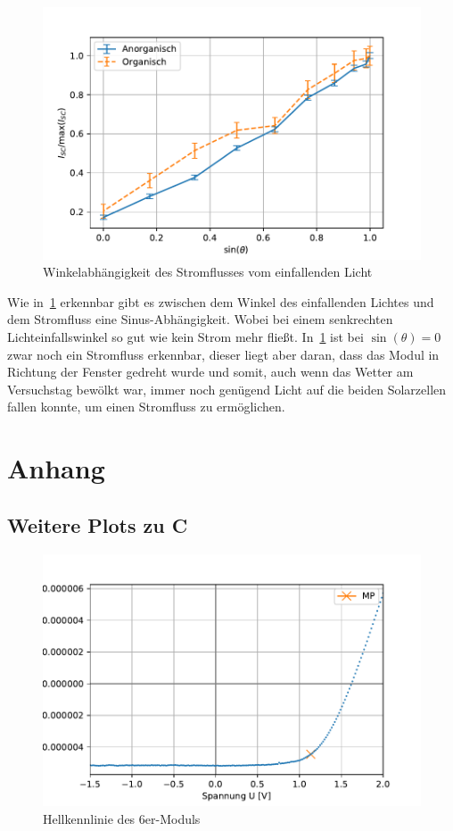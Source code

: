 \documentclass[slug=SZ, room=Hermann-Krone-Bau\,\ Labor\ 1.25, supervisor=Martin\ Kroll]{../../Lab_Report_LaTeX/lab_report}
\begin{document}
\begin{figure}[H]\centering
        \includegraphics[width=.5\columnwidth]{figs/python/E/relativ.pdf}
        \caption{Winkelabhängigkeit des Stromflusses vom einfallenden Licht}
        \label{fig:winkel}
\end{figure}

Wie in~\ref{fig:winkel} erkennbar gibt es zwischen dem Winkel des einfallenden
Lichtes und dem Stromfluss eine Sinus-Abhängigkeit. Wobei bei einem senkrechten
Lichteinfallswinkel so gut wie kein Strom mehr fließt.
In~\ref{fig:winkel} ist bei \(\sin(\theta) = 0\) zwar noch ein Stromfluss erkennbar,
dieser liegt aber daran, dass das Modul in Richtung der Fenster gedreht wurde und somit,
auch wenn das Wetter am Versuchstag bewölkt war, immer noch genügend Licht auf die beiden
Solarzellen fallen konnte, um einen Stromfluss zu ermöglichen.

\section{Anhang}
\label{sec:anh}

\subsection{Weitere Plots zu C}
\label{sec:plotsc}

\begin{figure}[H]\centering
	\includegraphics[width=.6\columnwidth]{figs/python/C/3x3_hell.pdf}
	\caption{Hellkennlinie des 6er-Moduls}
	\label{diag:hell6er}
\end{figure}
\end{document}
